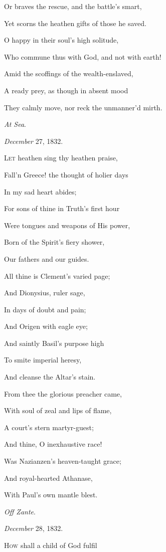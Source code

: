 Or braves the rescue, and the battle's smart,

Yet scorns the heathen gifts of those he saved.

O happy in their soul's high solitude,

Who commune thus with God, and not with earth!

Amid the scoffings of the wealth-enslaved,

A ready prey, as though in absent mood

They calmly move, nor reck the unmanner'd mirth.

\emph{At Sea}.

\emph{December} 27, 1832.


L\textsc{et} heathen sing thy heathen praise,

Fall'n Greece! the thought of holier days

In my sad heart abides;

For sons of thine in Truth's first hour

Were tongues and weapons of His power,

Born of the Spirit's fiery shower,

Our fathers and our guides.

All thine is Clement's varied page;

And Dionysius, ruler sage,

In days of doubt and pain;

And Origen with eagle eye;

And saintly Basil's purpose high

To smite imperial heresy,

And cleanse the Altar's stain. 

From thee the glorious preacher came,

With soul of zeal and lips of flame,

A court's stern martyr-guest;

And thine, O inexhaustive race!

Was Nazianzen's heaven-taught grace;

And royal-hearted Athanase,

With Paul's own mantle blest.

\emph{Off Zante}.

\emph{December} 28, 1832.


H\textsc{ow} shall a child of God fulfil

